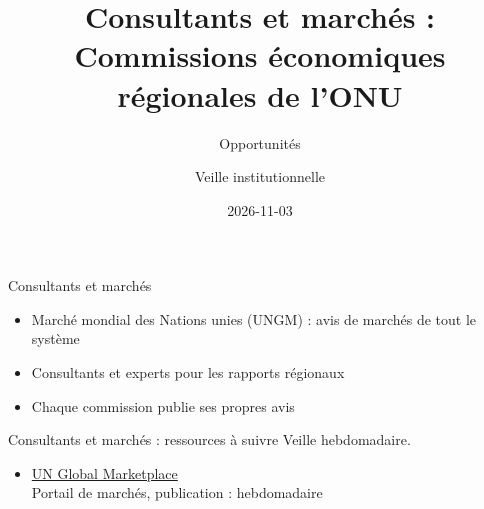 \documentclass[aspectratio=169,11pt]{beamer}
\title{Consultants et marchés : Commissions économiques régionales de l'ONU}
\subtitle{Opportunités}
\author{Veille institutionnelle}
\date{2026-11-03}
\begin{document}
\begin{frame}\titlepage\end{frame}

\begin{frame}{Consultants et marchés}
\begin{itemize}
\item Marché mondial des Nations unies (UNGM) : avis de marchés de tout le système
\item Consultants et experts pour les rapports régionaux
\item Chaque commission publie ses propres avis
\end{itemize}
\end{frame}

\begin{frame}{Consultants et marchés : ressources à suivre}
\small
Veille hebdomadaire.
\begin{itemize}
\item \href{https://www.ungm.org}{UN Global Marketplace}\\{\footnotesize Portail de marchés, publication : hebdomadaire}
\end{itemize}
\end{frame}
\end{document}
